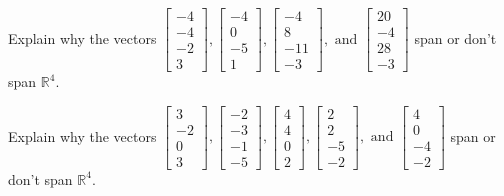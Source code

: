 \documentclass{article}
\begin{document}
\begin{exerciseStatement}
    Explain why the vectors \(\left[\begin{array}{r}
-4 \\
-4 \\
-2 \\
3
\end{array}\right] , \left[\begin{array}{r}
-4 \\
0 \\
-5 \\
1
\end{array}\right] , \left[\begin{array}{r}
-4 \\
8 \\
-11 \\
-3
\end{array}\right] , \text{ and } \left[\begin{array}{r}
20 \\
-4 \\
28 \\
-3
\end{array}\right]\) span or don't span \(\mathbb{R}^4\).



  
\end{exerciseStatement}

\begin{exerciseStatement}
    Explain why the vectors \(\left[\begin{array}{r}
3 \\
-2 \\
0 \\
3
\end{array}\right] , \left[\begin{array}{r}
-2 \\
-3 \\
-1 \\
-5
\end{array}\right] , \left[\begin{array}{r}
4 \\
4 \\
0 \\
2
\end{array}\right] , \left[\begin{array}{r}
2 \\
2 \\
-5 \\
-2
\end{array}\right] , \text{ and } \left[\begin{array}{r}
4 \\
0 \\
-4 \\
-2
\end{array}\right]\) span or don't span \(\mathbb{R}^4\).



  
\end{exerciseStatement}
\end{document}
